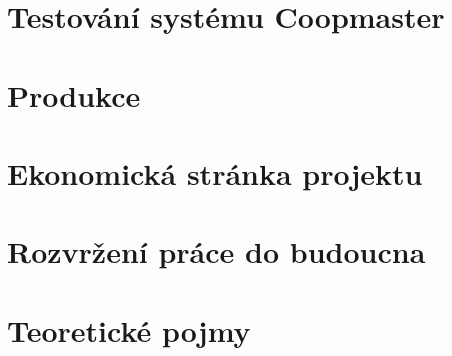 \newpage
\chapter{Testování systému Coopmaster}\label{ch:testovani-systemu-coopmaster}
\textcolor{\textcolorname}{}

\newpage
\chapter{Produkce}\label{ch:nasazeni-systemu-do-produkce}
\textcolor{\textcolorname}{}

\newpage
\chapter{Ekonomická stránka projektu}\label{ch:ekonomicka-stranka-projektu}
\textcolor{\textcolorname}{}

\newpage
\chapter{Rozvržení práce do budoucna}\label{ch:rozvrzeni-prace-do-budoucna}
\textcolor{\textcolorname}{}

\newpage
\chapter{Teoretické pojmy}\label{ch:teoreticke-pojmy}
\textcolor{\textcolorname}{}






